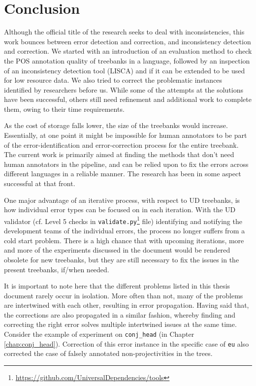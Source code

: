 \chapter*{Conclusion}

Although the official title of the research seeks to deal with inconsistencies, this work bounces between error detection and correction, and inconsistency detection and correction. We started with an introduction of an evaluation method to check the POS annotation quality of treebanks in a language, followed by an inspection of an inconsistency detection tool (LISCA) and if it can be extended to be used for low resource data. We also tried to correct the problematic instances identified by researchers before us. While some of the attempts at the solutions have been successful, others still need refinement and additional work to complete them, owing to their time requirements.

As the cost of storage falls lower, the size of the treebanks would increase. Essentially, at one point it might be impossible for human annotators to be part of the error-identification and error-correction process for the entire treebank. The current work is primarily aimed at finding the methods that don't need human annotators in the pipeline, and can be relied upon to fix the errors across different languages in a reliable manner. The research has been in some aspect successful at that front.

One major advantage of an iterative process, with respect to UD treebanks, is how individual error types can be focused on in each iteration. With the UD validator (cf. Level 5 checks in \verb|validate.py|\footnote{\url{https://github.com/UniversalDependencies/tools}} file) identifying and notifying the development teams of the individual errors, the process no longer suffers from a cold start problem. There is a high chance that with upcoming iterations, more and more of the experiments discussed in the document would be rendered obsolete for new treebanks, but they are still necessary to fix the issues in the present treebanks, if/when needed.

It is important to note here that the different problems listed in this thesis document rarely occur in isolation. More often than not, many of the problems are intertwined with each other, resulting in error propagation. Having said that, the corrections are also propagated in a similar fashion, whereby finding and correcting the right error solves multiple intertwined issues at the same time. Consider the example of experiment on \texttt{conj\_head} (in Chapter \ref{chap:conj_head}). Correction of this error instance in the specific case of \verb|eu| also corrected the case of falsely annotated non-projectivities in the trees.

